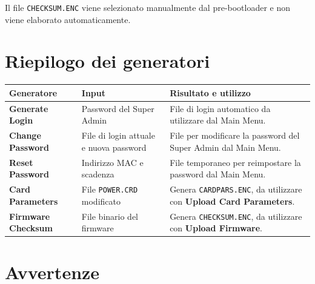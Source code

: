 \documentclass[11pt,a4paper]{article}
\newcommand{\button}[1]{\textbf{#1}}
\newcommand{\filename}[1]{\texttt{#1}}
\begin{document}
Il file \filename{CHECKSUM.ENC} viene selezionato manualmente
dal pre-bootloader e non viene elaborato automaticamente.

\section{Riepilogo dei generatori}

\renewcommand{\arraystretch}{1.4}

\begin{longtable}{p{3.2cm} p{4.2cm} p{5.2cm}}
\toprule
\textbf{Generatore} &
\textbf{Input} &
\textbf{Risultato e utilizzo} \\
\midrule
\endhead

\button{Generate Login} &
Password del Super Admin &
File di login automatico da utilizzare dal Main Menu. \\

\button{Change Password} &
File di login attuale e nuova password &
File per modificare la password del Super Admin dal Main Menu. \\

\button{Reset Password} &
Indirizzo MAC e scadenza &
File temporaneo per reimpostare la password dal Main Menu. \\

\button{Card Parameters} &
File \filename{POWER.CRD} modificato &
Genera \filename{CARDPARS.ENC}, da utilizzare con
\button{Upload Card Parameters}. \\

\button{Firmware Checksum} &
File binario del firmware &
Genera \filename{CHECKSUM.ENC}, da utilizzare con
\button{Upload Firmware}. \\

\bottomrule
\end{longtable}

\section{Avvertenze}
\end{document}
